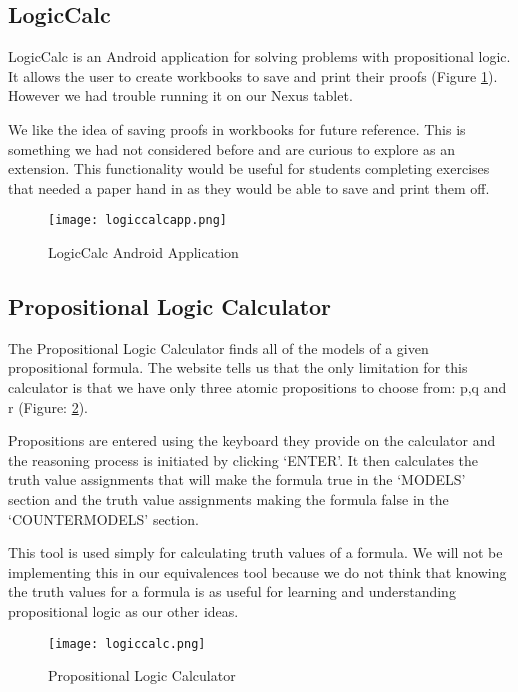 \documentclass{report}
\begin{document}
\subsection{LogicCalc}

LogicCalc is an Android application for solving problems with propositional logic. It allows the user to create workbooks to save and print their proofs (Figure \ref{logiccalcapp}). However we had trouble running it on our Nexus tablet.

We like the idea of saving proofs in workbooks for future reference. This is something we had not considered before and are curious to explore as an extension. This functionality would be useful for students completing exercises that needed a paper hand in as they would be able to save and print them off.

\begin{figure}[ht]
    \centering
    \texttt{[image: logiccalcapp.png]}
    \caption{LogicCalc Android Application}
    \label{logiccalcapp}
\end{figure}

\subsection{Propositional Logic Calculator}

The Propositional Logic Calculator\cite{logiccalc} finds all of the models of a given propositional formula. The website tells us that the only limitation for this calculator is that we have only three atomic propositions to choose from: p,q and r (Figure: \ref{logiccalc}).

Propositions are entered using the keyboard they provide on the calculator and the reasoning process is initiated by clicking `ENTER'. It then calculates the truth value assignments that will make the formula true in the `MODELS' section and the truth value assignments making the formula false in the `COUNTERMODELS' section.

This tool is used simply for calculating truth values of a formula. We will not be implementing this in our equivalences tool because we do not think that knowing the truth values for a formula is as useful for learning and understanding propositional logic as our other ideas.

\begin{figure}[ht]
    \centering
    \texttt{[image: logiccalc.png]}
    \caption{Propositional Logic Calculator}
    \label{logiccalc}
\end{figure}
\end{document}

